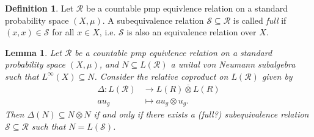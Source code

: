 \documentclass[12pt,letterpaper]{article}
\newcommand{\sub}{\subseteq}
\newcommand*\cls[1]{\overline{#1}}
\theoremstyle{definition}
\newtheorem{definition}{Definition}[]
\theoremstyle{plain}
\newtheorem{lemma}{Lemma}[]
\theoremstyle{remark}
\begin{document}
\begin{definition}
    Let $ \mathcal{R} $ be a countable pmp equivlence relation on a standard probability space $ (X,\mu) $. A subequivalence relation $ \mathcal{S}\sub \mathcal{R} $ is called \textit{full} if $ (x,x)\in \mathcal{S} $ for all $ x\in X $, i.e. $ \mathcal{S} $ is also an equivalence relation over $ X $.
\end{definition}

\begin{lemma}
    Let $ \mathcal{R} $ be a countable pmp equivlence relation on a standard probability space $ (X,\mu) $, and $ N\sub L(\mathcal{R}) $ a unital von Neumann subalgebra such that $ L^{\infty}(X)\sub N $. Consider the relative coproduct on $ L(\mathcal{R}) $ given by
    \begin{align*}
        \Delta : L(\mathcal{R})&\to L(R)\cls{\otimes}L(R)\\
        au_{g} &\mapsto au_{g}\otimes u_{g}.
    \end{align*}
    Then $ \Delta (N)\sub N \cls{\otimes} N $ if and only if there exists a (full?) subequivalence relation $ \mathcal{S}\sub \mathcal{R} $ such that $ N = L(\mathcal{S}) $.
\end{lemma}
\end{document}

